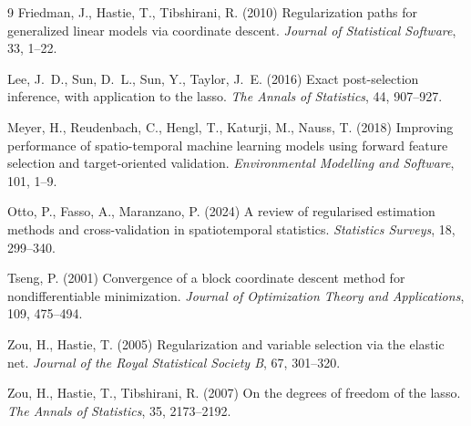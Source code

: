 \documentclass[11pt,a4paper]{article}
\begin{document}
\begin{thebibliography}{9}
\small
{}
Friedman, J., Hastie, T., Tibshirani, R. (2010)
Regularization paths for generalized linear models via coordinate descent.
\emph{Journal of Statistical Software}, 33, 1--22.

Lee, J.~D., Sun, D.~L., Sun, Y., Taylor, J.~E. (2016)
Exact post-selection inference, with application to the lasso.
\emph{The Annals of Statistics}, 44, 907--927.

Meyer, H., Reudenbach, C., Hengl, T., Katurji, M., Nauss, T. (2018)
Improving performance of spatio-temporal machine learning models using forward
feature selection and target-oriented validation.
\emph{Environmental Modelling and Software}, 101, 1--9.

Otto, P., Fasso, A., Maranzano, P. (2024)
A review of regularised estimation methods and cross-validation in
spatiotemporal statistics.
\emph{Statistics Surveys}, 18, 299--340.

Tseng, P. (2001)
Convergence of a block coordinate descent method for nondifferentiable
minimization.
\emph{Journal of Optimization Theory and Applications}, 109, 475--494.

Zou, H., Hastie, T. (2005)
Regularization and variable selection via the elastic net.
\emph{Journal of the Royal Statistical Society B}, 67, 301--320.

Zou, H., Hastie, T., Tibshirani, R. (2007)
On the degrees of freedom of the lasso.
\emph{The Annals of Statistics}, 35, 2173--2192.
\end{thebibliography}
\end{document}
